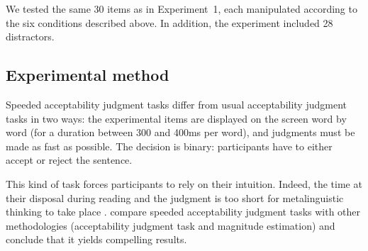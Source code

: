 \eal 
{}
\label{ex:exp02-subj-no}
\label{ex:exp02-obj-clitic-no}
\label{ex:exp02-obj-no}
\zl 

We tested the same 30 items as in Experiment~1, each manipulated according to the six conditions described above. In addition, the experiment included 28 distractors. 

\subsection{Experimental method}

Speeded acceptability judgment tasks differ from usual acceptability judgment tasks in two ways: the experimental items are displayed on the screen word by word (for a duration between 300 and 400ms per word), and judgments must be made as fast as possible. The decision is binary: participants have to either accept or reject the sentence. 

This kind of task forces participants to rely on their intuition. Indeed, the time at their disposal during reading and the judgment is too short for metalinguistic thinking to take place \citep[5]{Riou.2018}. \citet{Bader.2010} compare speeded acceptability judgment tasks with other methodologies (acceptability judgment task and magnitude estimation) and conclude that it yields compelling results. 

